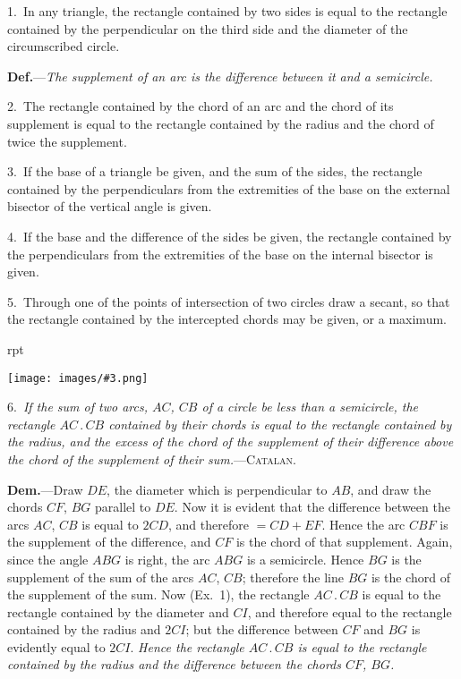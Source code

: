 \documentclass[oneside]{book}
\newcounter{wrapwidth}
\newcommand\imgflow[3]{
\setcounter{wrapwidth}{#1}
\begin{wrapfigure}[#2]{r}{\value{wrapwidth}pt}
\begin{center}
\vspace{-0.3in}
\texttt{[image: images/\#3.png]}
\end{center}
\end{wrapfigure}
}
\begin{document}
\begin{footnotesize}
1.~In any triangle, the rectangle contained by two sides is
equal to the rectangle contained by the perpendicular on the third
side and the diameter of the circumscribed circle.

\textbf{Def.}---\emph{The supplement of an arc is the difference between it and
a semicircle.}

2.~The rectangle contained by the chord of an arc and the
chord of its supplement is equal to the rectangle contained by
the radius and the chord of twice the supplement.

3.~If the base of a triangle be given, and the sum of the sides,
the rectangle contained by the perpendiculars from the extremities
of the base on the external bisector of the vertical angle is given.

4.~If the base and the difference of the sides be given, the
rectangle contained by the perpendiculars from the extremities
of the base on the internal bisector is given.

5.~Through one of the points of intersection of two circles
draw a secant, so that the rectangle contained by the intercepted
chords may be given, or a maximum.

\imgflow{135}{16}{f147}

6.~\emph{If the sum of two arcs, $AC$, $CB$ of a circle be less than a
semicircle, the rectangle $AC\,.\,CB$
contained by their chords is equal
to the rectangle contained by the
radius, and the excess of the chord
of the supplement of their difference
above the chord of the supplement of
their sum.}---\textsc{Catalan.}

\textbf{Dem.}---Draw $DE$, the diameter
which is perpendicular to $AB$, and
draw the chords $CF$, $BG$ parallel
to $DE$. Now it is evident that the
difference between the arcs $AC$, $CB$
is equal to $2 CD$, and therefore
$= CD + EF$. Hence the arc $CBF$
is the supplement of the difference, and $CF$ is the chord of that
supplement. Again, since the angle $ABG$ is right, the arc $ABG$
is a semicircle. Hence $BG$ is the supplement of the sum of the
arcs $AC$, $CB$; therefore the line $BG$ is the chord of the supplement
of the sum. Now (Ex.~1), the rectangle $AC\,.\,CB$ is equal
to the rectangle contained by the diameter and $CI$, and therefore
equal to the rectangle contained by the radius and $2 CI$; but the
difference between $CF$ and $BG$ is evidently equal to $2 CI$. \emph{Hence
the rectangle $AC\,.\,CB$ is equal to the rectangle contained by the
radius and the difference between the chords $CF$, $BG$.}


\end{footnotesize}
\end{document}
